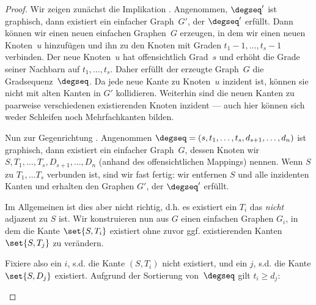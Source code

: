 \begin{proof}
    Wir  zeigen zunächst die Implikation .
    Angenommen, $\degseq'$ ist graphisch, dann existiert ein einfacher Graph~$G'$, der $\degseq'$ erfüllt.
    Dann können wir einen neuen einfachen Graphen~$G$ erzeugen, in dem wir einen neuen Knoten~$u$ hinzufügen und ihn zu den Knoten mit Graden $t_1{-}1, \ldots, t_s{-}1$ verbinden.
    Der neue Knoten~$u$ hat offensichtlich Grad~$s$ und erhöht die Grade seiner Nachbarn auf $t_1, \ldots, t_s$.
    Daher erfüllt der erzeugte Graph~$G$ die Gradsequenz~$\degseq$.
    Da jede neue Kante zu Knoten~$u$ inzident ist, können sie nicht mit alten Kanten in $G'$ kollidieren.
    Weiterhin sind die neuen Kanten zu paarweise verschiedenen existierenden Knoten inzident --- auch hier können sich weder Schleifen noch Mehrfachkanten bilden.

    Nun  zur Gegenrichtung .
    Angenommen $\degseq = (s, t_1, \ldots, t_s, d_{s+1}, \ldots, d_n)$ ist graphisch, dann existiert ein einfacher Graph~$G$, dessen Knoten wir $S, T_1, \ldots, T_s, D_{s+1}, \ldots, D_n$ (anhand des offensichtlichen Mappings) nennen.
    Wenn $S$ zu $T_1, \ldots T_s$ verbunden ist, sind wir fast fertig: wir entfernen $S$ und alle inzidenten Kanten und erhalten den Graphen $G'$, der $\degseq'$ erfüllt.

    Im Allgemeinen ist dies aber nicht richtig, d.h. es existiert ein $T_i$ das \emph{nicht} adjazent zu $S$ ist.
    Wir konstruieren nun aus $G$ einen einfachen Graphen $G_i$, in dem die Kante $\set{S, T_i}$ existiert ohne zuvor ggf. existierenden Kanten $\set{S, T_j}$ zu verändern.

    Fixiere also ein $i$, s.d. die Kante $(S, T_i)$ nicht existiert, und ein $j$, s.d. die Kante $\set{S, D_j}$ existiert.
    Aufgrund der Sortierung von~$\degseq$ gilt $t_i \ge d_j$:
    \begin{figure}
        \begin{center}
            \begin{tikzpicture}[
                    node distance=4em,
                    node/.style={draw, inner sep=0, minimum width=1.5em, minimum height=1.5em, circle},
                    edge/.style={draw, thick, black},
                    nonedge/.style={draw, dashed, red},
                ]


\end{tikzpicture}
\end{center}
\end{figure}
\end{proof}
